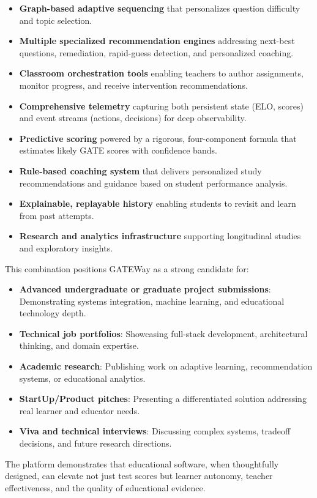 \documentclass[sigconf,authordraft,twoside]{acmart}
\newcommand{\project}{GATEWay}
\begin{document}
\begin{itemize}
\item \textbf{Graph-based adaptive sequencing} that personalizes question difficulty and topic selection.
\item \textbf{Multiple specialized recommendation engines} addressing next-best questions, remediation, rapid-guess detection, and personalized coaching.
\item \textbf{Classroom orchestration tools} enabling teachers to author assignments, monitor progress, and receive intervention recommendations.
\item \textbf{Comprehensive telemetry} capturing both persistent state (ELO, scores) and event streams (actions, decisions) for deep observability.
\item \textbf{Predictive scoring} powered by a rigorous, four-component formula that estimates likely GATE scores with confidence bands.
\item \textbf{Rule-based coaching system} that delivers personalized study recommendations and guidance based on student performance analysis.
\item \textbf{Explainable, replayable history} enabling students to revisit and learn from past attempts.
\item \textbf{Research and analytics infrastructure} supporting longitudinal studies and exploratory insights.
\end{itemize}

This combination positions \project{} as a strong candidate for:

\begin{itemize}
\item \textbf{Advanced undergraduate or graduate project submissions}: Demonstrating systems integration, machine learning, and educational technology depth.
\item \textbf{Technical job portfolios}: Showcasing full-stack development, architectural thinking, and domain expertise.
\item \textbf{Academic research}: Publishing work on adaptive learning, recommendation systems, or educational analytics.
\item \textbf{StartUp/Product pitches}: Presenting a differentiated solution addressing real learner and educator needs.
\item \textbf{Viva and technical interviews}: Discussing complex systems, tradeoff decisions, and future research directions.
\end{itemize}

The platform demonstrates that educational software, when thoughtfully designed, can elevate not just test scores but learner autonomy, teacher effectiveness, and the quality of educational evidence.
\end{document}
